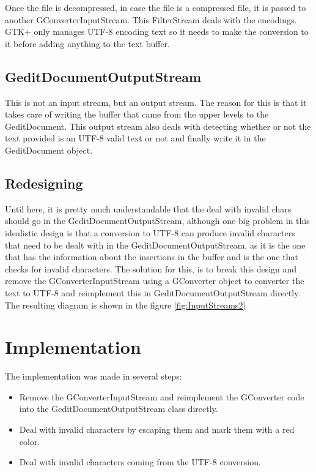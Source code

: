 Once the file is decompressed, in case the file is a compressed file, it is passed to another GConverterInputStream. This FilterStream deals with the encodings. GTK+ only manages UTF-8 encoding text so it needs to make the conversion to it before adding anything to the text buffer.

\subsection*{GeditDocumentOutputStream}

This is not an input stream, but an output stream. The reason for this is that it takes care of writing the buffer that came from the upper levels to the GeditDocument. This output stream also deals with detecting whether or not the text provided is an UTF-8 valid text or not and finally write it in the GeditDocument object.

\subsection{Redesigning}

Until here, it is pretty much understandable that the deal with invalid chars should go in the GeditDocumentOutputStream, although one big problem in this idealistic design is that a conversion to UTF-8 can produce invalid characters that need to be dealt with in the GeditDocumentOutputStream, as it is the one that has the information about the insertions in the buffer and is the one that checks for invalid characters. The solution for this, is to break this design and remove the GConverterInputStream using a GConverter object to converter the text to UTF-8 and reimplement this in GeditDocumentOutputStream directly. The resulting diagram is shown in the figure \ref{fig:InputStreams2}


\newpage
\section{Implementation}

The implementation was made in several steps:
\begin{itemize}
  \item Remove the GConverterInputStream and reimplement the GConverter code into the GeditDocumentOutputStream class directly.
  \item Deal with invalid characters by escaping them and mark them with a red color.
  \item Deal with invalid characters coming from the UTF-8 conversion.
\end{itemize}

